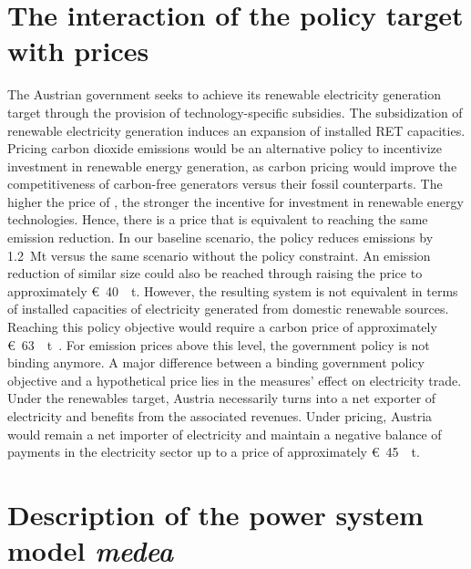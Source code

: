 \documentclass[review, 3p, times, 12pt, authoryear]{elsarticle}
\begin{document}
    \section{The interaction of the policy target with  prices} \label{subsec:interactions}
    The Austrian government seeks to achieve its renewable electricity generation target through the provision of technology-specific subsidies.
    The subsidization of renewable electricity generation induces an expansion of installed RET capacities.
    Pricing carbon dioxide emissions would be an alternative policy to incentivize investment in renewable energy generation, as carbon pricing would improve the competitiveness of carbon-free generators versus their fossil counterparts.
    The higher the price of , the stronger the incentive for investment in renewable energy technologies.
    Hence, there is a  price that is equivalent to reaching the same emission reduction.
    In our baseline scenario, the policy reduces  emissions by \SI{1.2}{\mega\tonne} versus the same scenario without the policy constraint.
    An emission reduction of similar size could also be reached through raising the  price to approximately \SI[per-mode=symbol,sticky-per, bracket-unit-denominator=false]{40}[\euro]{\per\tonne}.
    However, the resulting system is not equivalent in terms of installed capacities of electricity generated from domestic renewable sources.
    Reaching this policy objective would require a carbon price of approximately \SI[per-mode=symbol,sticky-per, bracket-unit-denominator=false]{63}[\euro]{\per\tonne\coo}.
    For emission prices above this level, the government policy is not binding anymore.
    A major difference between a binding government policy objective and a hypothetical  price lies in the measures' effect on electricity trade.
    Under the renewables target, Austria necessarily turns into a net exporter of electricity and benefits from the associated revenues.
    Under  pricing, Austria would remain a net importer of electricity and maintain a negative balance of payments in the electricity sector up to a  price of approximately \SI[per-mode=symbol,sticky-per, bracket-unit-denominator=false]{45}[\euro]{\per\tonne}.


    \section{Description of the power system model \emph{medea}} \label{sec:medea-desc}
\end{document}

